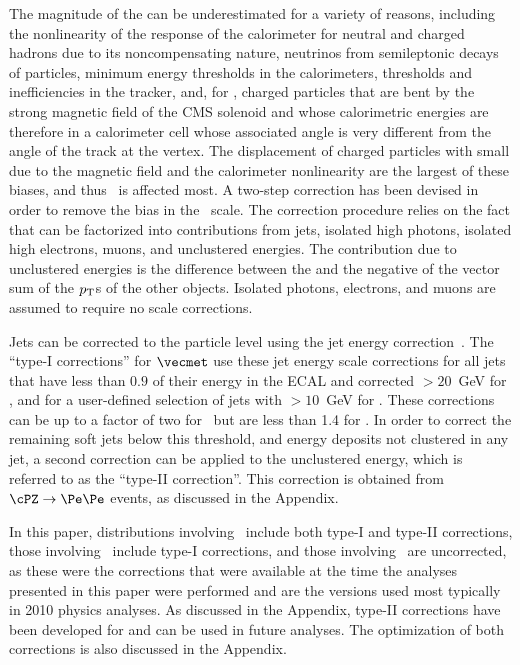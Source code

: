The magnitude of the \vecmet
can be underestimated for a
variety of reasons,
including
the nonlinearity of the response of the calorimeter
for neutral and charged hadrons due to its noncompensating nature,
neutrinos from semileptonic decays of particles,
minimum energy thresholds in the calorimeters, \pt thresholds and inefficiencies
in the tracker, and, for \calomet, charged particles that are bent
by the strong magnetic field of the CMS solenoid and whose
calorimetric energies are therefore in a calorimeter cell whose associated
angle
is very different from the angle of the track at the vertex.
The displacement of charged particles with small \pt due to
the magnetic field and the
calorimeter nonlinearity are the largest of these biases,
and thus \calomet\ is affected most.
A two-step correction has been devised in order to remove the bias in
the \vecmet\ scale.  The correction procedure relies on the fact that
\vecmet can be factorized into contributions from jets,
isolated high \pt photons, isolated high \pt electrons, muons, and unclustered energies.
The contribution due to unclustered energies is the difference between the \vecmet
and the negative of the vector sum of the $p_{\rm T}$s of the other objects.
Isolated photons, electrons, and muons are assumed to require no scale corrections.


Jets can be corrected to the particle
level using the jet energy correction~\cite{JME-10-003}.
The ``type-I corrections'' for
$\vecmet$ use these
jet energy scale corrections for
all jets that have less than $0.9$ of their energy in the ECAL
and corrected \pt$>20$~GeV for \calomet,
and for a user-defined selection of jets with \pt$>10$~GeV for \pfmet.
These corrections can be up to a factor of two for \calomet\
but are less than 1.4 for \pfmet \cite{JME-10-014} .
In order to correct the remaining soft jets below this threshold,
and energy deposits not clustered in any jet, a
second correction can be applied to the unclustered energy, which is
referred to as the ``type-II correction''.  This correction is obtained from
$\cPZ\to\Pe\Pe$ events, as discussed in the Appendix.

In this paper, distributions involving \calomet\ include both type-I and type-II corrections,
those involving \pfmet\ include type-I corrections, and those involving
\tcmet\ are uncorrected, as these were the corrections that were available at the time the analyses
presented in this paper were performed and are the versions used most typically
in 2010 physics analyses.
As discussed in the Appendix, type-II corrections have been developed for \pfmet
and can be used in future analyses.
The optimization of both corrections is also discussed in the Appendix.


